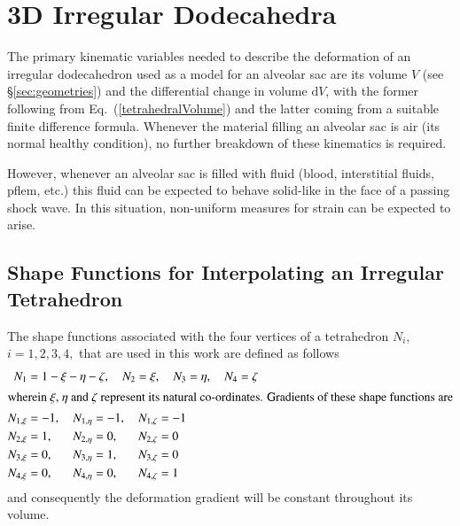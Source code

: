 \section{3D Irregular Dodecahedra}

The primary kinematic variables needed to describe the deformation of an irregular dodecahedron used as a model for an alveolar sac are its volume $V$ (see \S\ref{sec:geometries}) and the differential change in volume $\mathrm{d}V$, with the former following from Eq.~(\ref{tetrahedralVolume}) and the latter coming from a suitable finite difference formula.  Whenever the material filling an alveolar sac is air (its normal healthy condition), no further breakdown of these kinematics is required.  

However, whenever an alveolar sac is filled with fluid (blood, interstitial fluids, pflem, etc.) this fluid can be expected to behave solid-like in the face of a passing shock wave.  In this situation, non-uniform measures for strain can be expected to arise.

\subsection{Shape Functions for Interpolating an Irregular Tetrahedron}

The shape functions associated with the four vertices of a tetrahedron $N_i$, $i = 1, 2, 3, 4,$ that are used in this work are defined as follows
\begin{subequations}
    \begin{align}
    N_1 & = 1 - \xi - \eta - \zeta , \quad
    N_2 = \xi , \quad
    N_3 = \eta , \quad
    N_4 = \zeta \\
    \intertext{wherein $\xi$, $\eta$ and $\zeta$ represent its natural co-ordinates. Gradients of these shape functions are} 
    N_{1,\xi} & = -1 , \quad N_{1,\eta} = -1 , \quad N_{1,\zeta} = -1 \notag \\
    N_{2,\xi} & = 1 , \quad \phantom{-} N_{2,\eta} = 0 , \quad \phantom{-} N_{2,\zeta} = 0 \notag \\
    N_{3,\xi} & = 0 , \quad \phantom{-} N_{3,\eta} = 1 , \quad \phantom{-} N_{3,\zeta} = 0 \notag \\
    N_{4,\xi} & = 0 , \quad \phantom{-} N_{4,\eta} = 0 , \quad \phantom{-} N_{4,\zeta} = 1 
    \end{align}
\end{subequations}
and consequently the deformation gradient will be constant throughout its volume.

